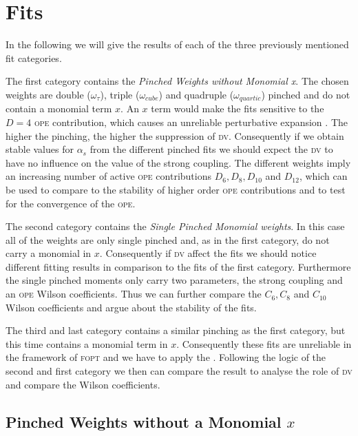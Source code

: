 \documentclass[../../index.tex]{subfiles}
\begin{document}
\section{Fits}
In the following we will give the results of each of the three previously
mentioned fit categories.

The first category contains the \textit{Pinched Weights without Monomial x}. The
chosen weights are double (\(\omega_\tau\)), triple (\(\omega_{cube}\)) and
quadruple (\(\omega_{quartic}\)) pinched and do not contain a monomial term
\(x\). An \(x\) term would make the fits sensitive to the \(D=4\) \textsc{ope}
contribution, which causes an unreliable perturbative expansion
\cite{Beneke2012}. The higher the pinching, the higher the suppression of
\textsc{dv}. Consequently if we obtain stable values for \(\alpha_s\) from the
different pinched fits we should expect the \textsc{dv} to have no influence on
the value of the strong coupling. The different weights imply an increasing
number of active \textsc{ope} contributions \(D_6, D_8, D_{10}\) and \(D_{12}\),
which can be used to compare to the stability of higher order \textsc{ope}
contributions and to test for the convergence of the \textsc{ope}.

The second category contains the \textit{Single Pinched Monomial weights}. In
this case all of the weights are only single pinched and, as in the first
category, do not carry a monomial in \(x\). Consequently if \textsc{dv} affect
the fits we should notice different fitting results in comparison to the fits of
the first category. Furthermore the single pinched moments only carry two
parameters, the strong coupling and an \textsc{ope} Wilson coefficients. Thus we
can further compare the \(C_6, C_8\) and \(C_{10}\) Wilson coefficients and
argue about the stability of the fits.

The third and last category contains a similar pinching as the first category,
but this time contains a monomial term in \(x\). Consequently these fits are
unreliable in the framework of \textsc{fopt} and we have to apply the
. Following the logic of the second and first category we
then can compare the result to analyse the role of \textsc{dv} and compare the
Wilson coefficients.

\subsection{Pinched Weights without a Monomial \(x\)}
\end{document}
